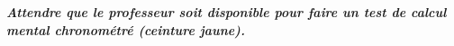 \exo{}

\begin{center}
	\textbf{\textit{Attendre que le professeur soit disponible pour faire un test de calcul mental chronométré (ceinture jaune).}}
 	
\end{center}